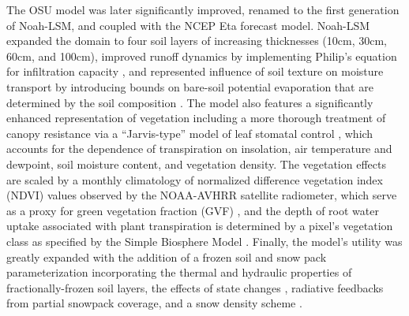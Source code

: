 The OSU model was later significantly improved, renamed to the first generation of Noah-LSM, and coupled with the NCEP Eta forecast model. Noah-LSM expanded the domain to four soil layers of increasing thicknesses (10cm, 30cm, 60cm, and 100cm), improved runoff dynamics by implementing Philip's equation for infiltration capacity \citep{schaake_simple_1996}, and represented influence of soil texture on moisture transport by introducing bounds on bare-soil potential evaporation that are determined by the soil composition \citep{betts_assessment_1997} \citep{mahfouf_comparative_1991}. The model also features a significantly enhanced representation of vegetation including a more thorough treatment of canopy resistance via a ``Jarvis-type'' model of leaf stomatal control \citep{jarvis_interpretation_1976} \citep{jacquemin_sensitivity_1990}, which accounts for the dependence of transpiration on insolation, air temperature and dewpoint, soil moisture content, and vegetation density. The vegetation effects are scaled by a monthly climatology of normalized difference vegetation index (NDVI) values observed by the NOAA-AVHRR satellite radiometer, which serve as a proxy for green vegetation fraction (GVF) \citep{gutman_derivation_1998} \citep{chen_modeling_1996}, and the depth of root water uptake associated with plant transpiration is determined by a pixel's vegetation class as specified by the Simple Biosphere Model \citep{dorman_global_1989}. Finally, the model's utility was greatly expanded with the addition of a frozen soil and snow pack parameterization incorporating the thermal and hydraulic properties of fractionally-frozen soil layers, the effects of state changes \citep{chen_modeling_1996} \citep{koren_parameterization_1999}, radiative feedbacks from partial snowpack coverage, and a snow density scheme \citep{ek_implementation_2003}.

